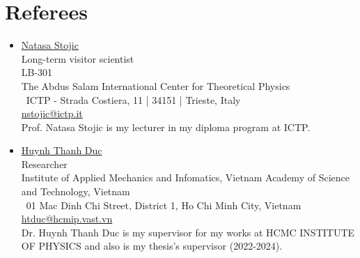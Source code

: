 \documentclass[letterpaper,11pt]{article}
\newcommand{\resumeItem}[1]{
	\item\small{
		{#1 \vspace{-2pt}}
	}
}
\newcommand{\resumeSubItem}[1]{\resumeItem{#1}\vspace{-4pt}}
\newcommand{\resumeSubHeadingListStart}{\begin{itemize}[leftmargin=0.15in, label={}]}
\newcommand{\resumeSubHeadingListEnd}{\end{itemize}}
\begin{document}
\section{Referees}
\resumeSubHeadingListStart
\resumeSubItem{\href{https://www.ictp.it/member/natasa-stojic}{\Large Natasa Stojic\faLink}}\\\vspace{10pt}
\hspace{0.5cm}Long-term visitor scientist\\\hspace{0.5cm}LB-301\\\hspace{0.5cm}The Abdus Salam International Center for Theoretical Physics\\\hspace{0.5cm}\faMapMarker\, ICTP - Strada Costiera, 11 | 34151 | Trieste, Italy\\\hspace{0.5cm}\faAt\href{mailto:nstojic@ictp.it}{\color{blue}\null \hspace{1pt} nstojic@ictp.it}\\
\hspace{0.5cm}Prof. Natasa Stojic is my lecturer in my diploma program at ICTP.
\resumeSubItem{\href{https://scholar.google.com.vn/citations?hl=en&user=EecHVyQAAAAJ&view_op=list_works&sortby=pubdate}{\Large Huynh Thanh Duc\faLink}}\\
\vspace{10pt}
\hspace{0.5cm}Researcher\\\hspace{0.5cm}Institute of Applied Mechanics and Infomatics, Vietnam Academy of Science and Technology, Vietnam \\\hspace{0.5cm}\faMapMarker\, 01 Mac Dinh Chi Street, District 1, Ho Chi Minh City, Vietnam\\\hspace{0.5cm}\faAt\href{mailto:nstojic@ictp.it}{\color{blue}\null \hspace{1pt} htduc@hcmip.vast.vn}\\
\hspace{0.5cm}Dr. Huynh Thanh Duc is my supervisor for my works at HCMC INSTITUTE OF PHYSICS and also is my thesis's supervisor (2022-2024).
\resumeSubHeadingListEnd	
\end{document}
